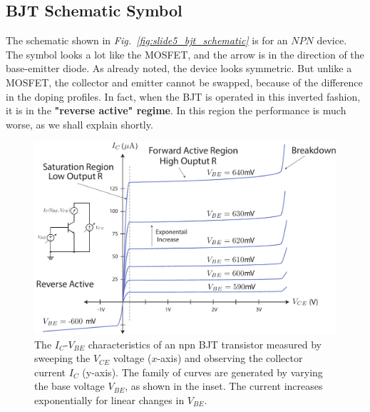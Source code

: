 \subsection{BJT Schematic Symbol}
The schematic shown in \emph{Fig.~\ref{fig:slide5_bjt_schematic}} is for an $NPN$ device.  The symbol looks a lot like the MOSFET, and the arrow is in the direction of the base-emitter diode.  As already noted, the device looks symmetric.  But unlike a MOSFET, the collector and emitter cannot be swapped, because of the difference in the doping profiles. In fact, when the BJT is operated in this inverted fashion, it is in the \textbf{"reverse active" regime}.  In this region the performance is much worse, as we shall explain shortly.
\newpage
\begin{figure}[t]
\centering
\includegraphics[width=\columnwidth]{slide8_bjt_ic_vs_ve_curves}
\caption{The $I_C$-$V_{BE}$ characteristics of an npn BJT transistor measured by sweeping the $V_{CE}$ voltage ($x$-axis) and observing the collector current $I_C$ (y-axis).  The family of curves are generated by varying the base voltage $V_{BE}$, as shown in the inset.  The current increases exponentially for linear changes in $V_{BE}$.}
\label{fig:slide8_bjt_ic_vs_ve_curves}
\end{figure}
